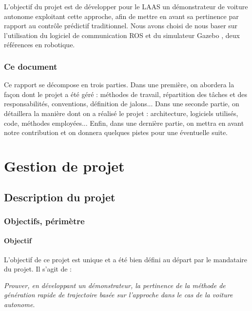 \documentclass[a4paper,12pt]{report}
\begin{document}
L'objectif du projet est de développer pour le LAAS un démonstrateur de voiture autonome exploitant cette approche, afin de mettre en avant sa pertinence par rapport au contrôle prédictif traditionnel. Nous avons choisi de nous baser sur l'utilisation du logiciel de communication ROS \cite{ROS} et du simulateur Gazebo \cite{Gazebo}, deux références en robotique.

\subsection*{Ce document}
Ce rapport se décompose en trois parties. Dans une première, on abordera la façon dont le projet a été géré : méthodes de travail, répartition des tâches et des responsabilités, conventions, définition de jalons... Dans une seconde partie, on détaillera la manière dont on a réalisé le projet : architecture, logiciels utilisés, code, méthodes employées... Enfin, dans une dernière partie, on mettra en avant notre contribution et on donnera quelques pistes pour une éventuelle suite.









\chapter{Gestion de projet}

\section{Description du projet}
\subsection{Objectifs, périmètre}

\subsubsection{Objectif} 
L'objectif de ce projet est unique et a été bien défini au départ par le mandataire du projet. Il s'agit de :

\begin{center}
\textit{Prouver, en développant un démonstrateur, la pertinence de la méthode de génération rapide de trajectoire basée sur l'approche \cite{mansard} dans le cas de la voiture autonome}.
\end{center}
\end{document}
